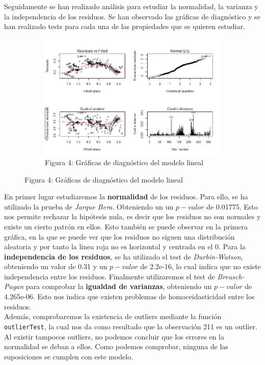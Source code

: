 \documentclass[a4paper, 9pt]{article}
\begin{document}
Seguidamente se han realizado análisis para estudiar la normalidad, la varianza y la independencia de los residuos. Se han observado las gráficas de diagnóstico  y se han realizado tests para cada una de las propiedades que se quieren estudiar.

\begin{figure}[H]
  \centering
  \begin{subfigure}[b]{0.5\linewidth}
    \includegraphics[width=\linewidth]{report/images/question-2/Rplot.png}
    \caption{Figura 4: Gráficas de diagnóstico del modelo lineal}
  \end{subfigure}
  \label{fig:coffee}
\end{figure}

En primer lugar estudiaremos la \textbf{normalidad} de los residuos. Para ello, se ha utilizado la prueba de \textit{Jarque Bera}. Obteniendo un un $p-valor$ de 0.01775. Esto nos permite rechazar la hipótesis nula, es decir que los residuos no son normales y existe un cierto patrón en ellos. Esto también se puede observar en la primera gráfica, en la que se puede ver que los residuos no siguen una distribución aleatoria y por tanto la linea roja no es horizontal y centrada en el 0. Para la \textbf{independencia de los residuos}, se ha utilizado el test de \textit{Durbin-Watson}, obteniendo un valor de 0.31 y un $p-valor$ de 2.2e-16, lo cual indica que no existe independencia entre los residuos. Finalmente utilizaremos el test de \textit{Breusch-Pagan} para comprobar la \textbf{igualdad de varianzas}, obteniendo un $p-valor$ de 4.265e-06. Esto nos indica que existen problemas de homoceidasticidad entre los residuos. \\

Además, comprobaremos la existencia de outliers mediante la función \texttt{outlierTest}, la cual nos da como resultado que la observación 211 es un outlier. Al existir tampocos outliers, no podemos concluir que los errores en la normalidad se deban a ellos. Como podemos comprobar, ninguna de las suposiciones se cumplen con este modelo.
\end{document}
